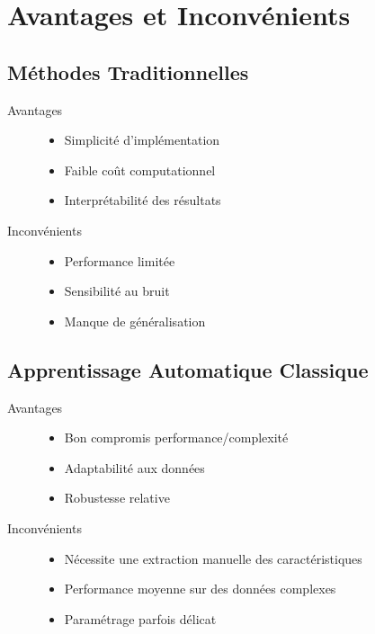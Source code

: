 \section{Avantages et Inconvénients}

\subsection{Méthodes Traditionnelles}
\begin{description}
    \item[Avantages] 
        \begin{itemize}
            \item Simplicité d'implémentation
            \item Faible coût computationnel
            \item Interprétabilité des résultats
        \end{itemize}
    \item[Inconvénients]
        \begin{itemize}
            \item Performance limitée
            \item Sensibilité au bruit
            \item Manque de généralisation
        \end{itemize}
\end{description}

\subsection{Apprentissage Automatique Classique}
\begin{description}
    \item[Avantages]
        \begin{itemize}
            \item Bon compromis performance/complexité
            \item Adaptabilité aux données
            \item Robustesse relative
        \end{itemize}
    \item[Inconvénients]
        \begin{itemize}
            \item Nécessite une extraction manuelle des caractéristiques
            \item Performance moyenne sur des données complexes
            \item Paramétrage parfois délicat
        \end{itemize}
\end{description}

